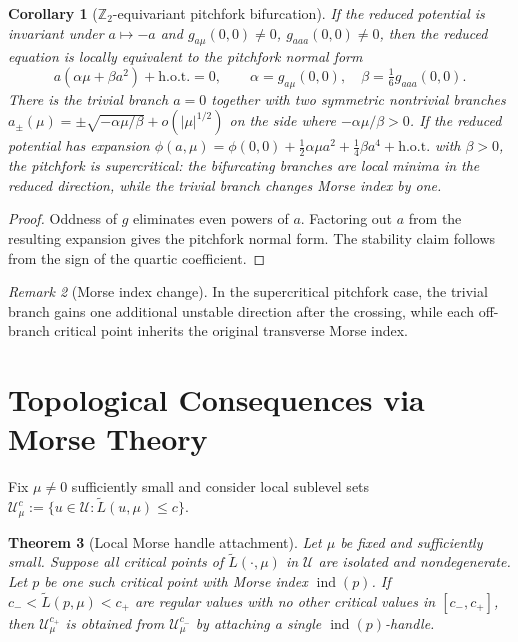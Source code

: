 \documentclass[11pt, reqno]{amsart}
\theoremstyle{plain}
\newtheorem{theorem}{Theorem}[section]
\newtheorem{corollary}[theorem]{Corollary}
\theoremstyle{definition}
\theoremstyle{remark}
\newtheorem{remark}[theorem]{Remark}
\DeclareMathOperator{\ind}{ind}
\begin{document}
\begin{corollary}[$\mathbb Z_2$-equivariant pitchfork bifurcation]\label{cor:pitchfork}
If the reduced potential is invariant under $a\mapsto -a$ and
$g_{a\mu}(0,0)\neq 0$, $g_{aaa}(0,0)\neq 0$,
then the reduced equation is locally equivalent to the pitchfork normal form
\begin{equation}
  a(\alpha\mu+\beta a^2)+\text{h.o.t.}=0,
  \qquad \alpha=g_{a\mu}(0,0),\quad \beta=\tfrac16 g_{aaa}(0,0).
\end{equation}
There is the trivial branch $a=0$ together with two symmetric nontrivial branches
$a_\pm(\mu)=\pm \sqrt{-\alpha\mu/\beta}+o(|\mu|^{1/2})$
on the side where $-\alpha\mu/\beta>0$.
If the reduced potential has expansion
$\phi(a,\mu)=\phi(0,0)+\tfrac12 \alpha \mu a^2+\tfrac14 \beta a^4+\text{h.o.t.}$
with $\beta>0$, the pitchfork is supercritical: the bifurcating branches are local minima in the reduced direction, while the trivial branch changes Morse index by one.
\end{corollary}

\begin{proof}
Oddness of $g$ eliminates even powers of $a$. Factoring out $a$ from the resulting expansion gives the pitchfork normal form. The stability claim follows from the sign of the quartic coefficient.
\end{proof}

\begin{remark}[Morse index change]\label{rem:morse-index-change}
In the supercritical pitchfork case, the trivial branch gains one additional unstable direction after the crossing, while each off-branch critical point inherits the original transverse Morse index.
\end{remark}

\section{Topological Consequences via Morse Theory}\label{sec:morse}

Fix $\mu\neq 0$ sufficiently small and consider local sublevel sets
$\mathcal U_\mu^c:=\{u\in\mathcal U:\widetilde L(u,\mu)\le c\}$.

\begin{theorem}[Local Morse handle attachment]\label{thm:handle-attachment}
Let $\mu$ be fixed and sufficiently small. Suppose all critical points of $\widetilde L(\cdot,\mu)$ in $\mathcal U$ are isolated and nondegenerate. Let $p$ be one such critical point with Morse index
$\ind(p)$.
If $c_-<\widetilde L(p,\mu)<c_+$
are regular values with no other critical values in $[c_-,c_+]$, then $\mathcal U_\mu^{c_+}$ is obtained from $\mathcal U_\mu^{c_-}$ by attaching a single $\ind(p)$-handle.
\end{theorem}
\end{document}
